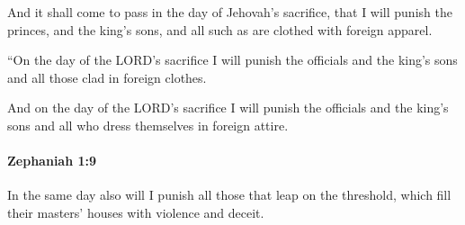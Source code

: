 			\begin{versebox}
					\item[BHS] 
					\item[LXX] 
					\item[ASV] And it shall come to pass in the day of Jehovah's sacrifice, that I will punish the princes, and the king's sons, and all such as are clothed with foreign apparel.
					\item[NIV] “On the day of the LORD’s sacrifice I will punish the officials and the king’s sons and all those clad in foreign clothes.
					\item[NRSV] And on the day of the LORD’s sacrifice I will punish the officials and the king’s sons and all who dress themselves in foreign attire.
			\end{versebox}

		\paragraph{Zephaniah 1:9} %
			\label{ZEPHANIAH-1-9}

			In the same day also will I punish all those that leap on the threshold, which fill their masters’ houses with violence and deceit.

